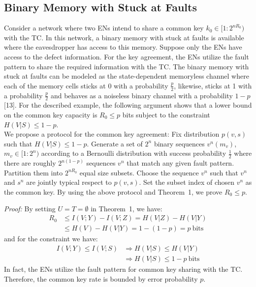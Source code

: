\documentclass[conference,8pt]{IEEEtran}
\begin{document}
{{\subsection{Binary Memory with Stuck at Faults}
Consider a network where two ENs intend to share a common key ${k_0 \in [1:2^{nR_0})}$ with the TC. In this network, a binary memory with stuck at faults is available where the eavesdropper has access to this memory. Suppose only the ENs have access to the defect information. For the key agreement, the ENs utilize the fault pattern to share the required information with the TC. The binary memory with stuck at faults can be modeled as the state-dependent memoryless channel where each of the memory cells sticks at $0$ with a probability $\frac{p}{2}$, likewise, sticks at 1 with a probability $\frac{p}{2}$ and behaves as a noiseless binary channel with a probability $1-p$ [13]. For the described example, the following argument shows that a lower bound on the common key capacity is $R_0 \leq p$ bits subject to the constraint $H(V|S) \leq 1-p$. \\

We propose a protocol for the common key agreement: Fix distribution $p(v,s)$ such that $H(V|S) \leq 1-p$. Generate a set of $2^n$ binary sequences $v^n(m_v)$, ${m_v \in {[1:2^{n})}}$ according to a Bernoulli distribution with success probability $\frac{1}{2}$ where there are roughly $2^{n(1-p)}$ sequences $v^n$ that match any given fault pattern. Partition them into $2^{nR_0}$ equal size subsets. Choose the sequence $v^n$ such that $v^n$ and $s^n$ are jointly typical respect to $p(v,s)$. Set the subset index of chosen $v^n$ as the common key. By using the above protocol and Theorem~1, we prove $R_0 \leq p$.

\emph{Proof:} By setting $U=T=\emptyset$ in Theorem~1, we have:
\begin{align}
R_0 &\leq I(V;Y)-I(V;Z)=H(V|Z)-H(V|Y) \nonumber \\
&\leq H(V)-H(V|Y) =1-(1-p)=p \ \text{bits} \nonumber
\end{align}
and for the constraint we have:
\begin{align}
I(V;Y) \leq I(V;S) &\Rightarrow H(V|S) \leq H(V|Y) \nonumber \\ 
&\Rightarrow H(V|S) \leq 1-p \nonumber \ \text{bits}
\end{align}
In fact, the ENs utilize the fault pattern for  common key sharing with the TC. Therefore, the common key rate is bounded by error probability $p$.

}}
\end{document}
